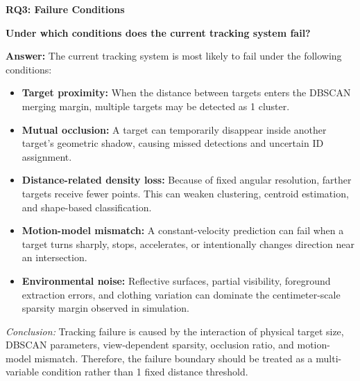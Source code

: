 \documentclass[11pt,a4paper]{report}
\newcommand{\boxitemtitle}[1]{
    \vspace{0.5em}
    {\large\textbf{\color{DeepBlue} #1}}\par
    \vspace{0.8em}
}
\begin{document}
\newpage

\boxitemtitle{RQ3: Failure Conditions}
\begin{contentbox}
\textbf{Under which conditions does the current tracking system fail?}

\vspace{0.8em}
\textbf{Answer:} The current tracking system is most likely to fail under the following conditions:
\begin{itemize}[leftmargin=*]
    \item \textbf{Target proximity:} When the distance between targets enters the DBSCAN merging margin, multiple targets may be detected as 1 cluster.
    \item \textbf{Mutual occlusion:} A target can temporarily disappear inside another target's geometric shadow, causing missed detections and uncertain ID assignment.
    \item \textbf{Distance-related density loss:} Because of fixed angular resolution, farther targets receive fewer points. This can weaken clustering, centroid estimation, and shape-based classification.
    \item \textbf{Motion-model mismatch:} A constant-velocity prediction can fail when a target turns sharply, stops, accelerates, or intentionally changes direction near an intersection.
    \item \textbf{Environmental noise:} Reflective surfaces, partial visibility, foreground extraction errors, and clothing variation can dominate the centimeter-scale sparsity margin observed in simulation.
\end{itemize}

\textit{Conclusion:} Tracking failure is caused by the interaction of physical target size, DBSCAN parameters, view-dependent sparsity, occlusion ratio, and motion-model mismatch. Therefore, the failure boundary should be treated as a multi-variable condition rather than 1 fixed distance threshold.
\end{contentbox}
\end{document}
